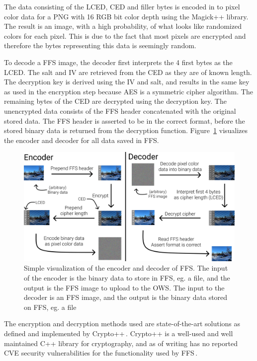 The data consisting of the LCED, CED and filler bytes is encoded in to pixel color data for a PNG with 16 RGB bit color depth using the Magick++ library. The result is an image, with a high probability, of what looks like randomized colors for each pixel. This is due to the fact that most pixels are encrypted and therefore the bytes representing this data is seemingly random.

To decode a FFS image, the decoder first interprets the 4 first bytes as the LCED. The salt and IV are retrieved from the CED as they are of known length. The decryption key is derived using the IV and salt, and results in the same key as used in the encryption step because AES is a symmetric cipher algorithm. The remaining bytes of the CED are decrypted using the decryption key. The unencrypted data consists of the FFS header concatenated with the original stored data. The FFS header is asserted to be in the correct format, before the stored binary data is returned from the decryption function. Figure~\ref{fig:file_enc_dec} visualizes the encoder and decoder for all data saved in FFS.

\begin{figure}[!ht]
	\begin{center}
	  \includegraphics[width=1.0\textwidth]{figures/encoder_decoder.png}
	\end{center}
	\caption{Simple visualization of the encoder and decoder of FFS. The input of the encoder is the binary data to store in FFS, eg. a file, and the output is the FFS image to upload to the OWS. The input to the decoder is an FFS image, and the output is the binary data stored on FFS, eg. a file}
	\label{fig:file_enc_dec}
\end{figure}

The encryption and decryption methods used are state-of-the-art solutions as defined and implemented by Crypto++\,\cite{CryptoLibraryFree}. Crypto++ is a well-used and well maintained C++ library for cryptography, and as of writing has no reported CVE security vulnerabilities for the functionality used by FFS\,\cite{CryptoppSecurityVulnerabilities}.

